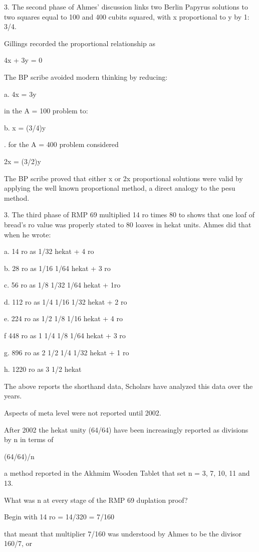 \documentclass[12pt]{article}
\begin{document}
3. The second phase of Ahmes' discussion links two Berlin Papyrus solutions to two squares equal to 100 and 400 cubits squared, with x proportional to y by 1: 3/4.

Gillings recorded the proportional relationship as

4x + 3y = 0

 The BP scribe avoided modern thinking by reducing:

a. 4x = 3y

in the A = 100 problem to:

b. x = (3/4)y

. for the A = 400 problem considered

 2x = (3/2)y

The BP scribe proved that either x or 2x proportional solutions were valid by applying the well known proportional method, a direct analogy to the pesu method.

3. The third phase of RMP 69 multiplied 14 ro times 80 to shows that one loaf of bread's ro value was properly stated to 80 loaves in hekat units. Ahmes did that when he wrote:

a. 14 ro as 1/32 hekat + 4 ro

b. 28 ro as 1/16 1/64 hekat + 3 ro

c. 56 ro as 1/8 1/32 1/64 hekat + 1ro

d. 112 ro as 1/4 1/16 1/32 hekat + 2 ro

e. 224 ro as 1/2 1/8 1/16 hekat + 4 ro

f  448 ro as 1 1/4 1/8 1/64 hekat + 3 ro

g. 896 ro as 2 1/2 1/4 1/32 hekat + 1 ro

h. 1220 ro as 3 1/2 hekat

The above reports the shorthand data, Scholars have analyzed this data over the years.

Aspects of meta level were not reported until 2002. 

After 2002 the hekat unity (64/64) have been increasingly reported as divisions by n in terms of

(64/64)/n

a method reported in the Akhmim Wooden Tablet that set n = 3, 7, 10, 11 and 13.

What was n at every stage of the RMP 69 duplation proof?

Begin with 14 ro = 14/320 = 7/160

that meant that multiplier 7/160 was understood by Ahmes to be the divisor 160/7, or
\end{document}

